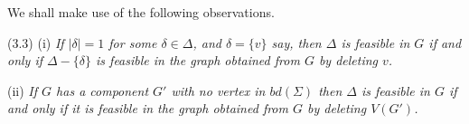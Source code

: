 We shall make use of the following observations.

\stmt
(3.3) (i) \textit{If $|\delta| = 1$ for some $\delta \in \Delta$, and $\delta = \{v\}$ say, then $\Delta$ is feasible in $G$ if and only if $\Delta - \{\delta\}$ is feasible in the graph obtained from $G$ by deleting $v$.}

\hspace*{12pt}(ii) \textit{If $G$ has a component $G'$ with no vertex in $bd(\Sigma)$ then $\Delta$ is feasible in $G$ if and only if it is feasible in the graph obtained from $G$ by deleting $V(G')$.}
